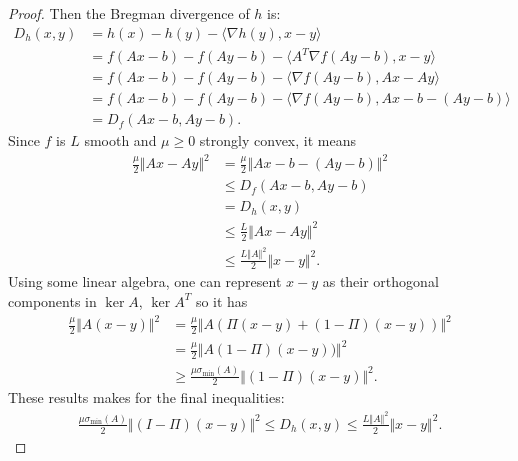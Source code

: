 \documentclass[12pt]{article}
\begin{document}
        \begin{proof}
            Then the Bregman divergence of $h$ is: 
            \begin{align*}
                D_h(x, y) &= h(x) - h(y) - \langle \nabla h(y), x - y\rangle
                \\
                &= f(Ax - b) - f(Ay - b) - \langle A^T\nabla f(Ay - b), x - y\rangle
                \\
                &= f(Ax - b) - f(Ay - b) - \langle \nabla f(Ay - b), Ax - Ay\rangle
                \\
                &= f(Ax - b) - f(Ay - b) - \langle \nabla f(Ay - b), Ax - b - (Ay - b)\rangle
                \\
                &= D_f(Ax - b, Ay - b). 
            \end{align*}
            Since $f$ is $L$ smooth and $\mu \ge 0$ strongly convex, it means 
            \begin{align*}
                \frac{\mu}{2}\Vert Ax - Ay\Vert^2
                &= 
                \frac{\mu}{2}\Vert Ax - b - (Ay - b)\Vert^2 
                \\
                &\le D_f(Ax - b, Ay - b)
                \\
                &= D_h(x, y) 
                \\
                &\le \frac{L}{2} \Vert Ax - Ay\Vert^2
                \\
                &\le \frac{L\Vert A\Vert^2}{2} \Vert x - y\Vert^2. 
            \end{align*}
            Using some linear algebra, one can represent $x - y$ as their orthogonal components in $\ker A$, $\ker A^T$ so it has 
            \begin{align*}
                \frac{\mu}{2}\Vert A(x - y)\Vert^2 &= 
                \frac{\mu}{2}\Vert A(\Pi(x - y) + (1 - \Pi)(x - y))\Vert^2
                \\
                &= 
                \frac{\mu}{2}\Vert A(1 - \Pi)(x - y))\Vert^2
                \\
                &\ge \frac{\mu\sigma_{\min}(A)}{2}\Vert (1 - \Pi)(x - y)\Vert^2. 
            \end{align*}
            These results makes for the final inequalities: 
            \begin{align*}
                \frac{\mu\sigma_{\min}(A)}{2}\Vert (I - \Pi)(x - y)\Vert^2
                \le 
                D_h(x, y) \le 
                \frac{L\Vert A\Vert^2}{2}\Vert x - y\Vert^2. 
            \end{align*}
        \end{proof}
        \begin{theorem}
        \end{theorem}
\end{document}
